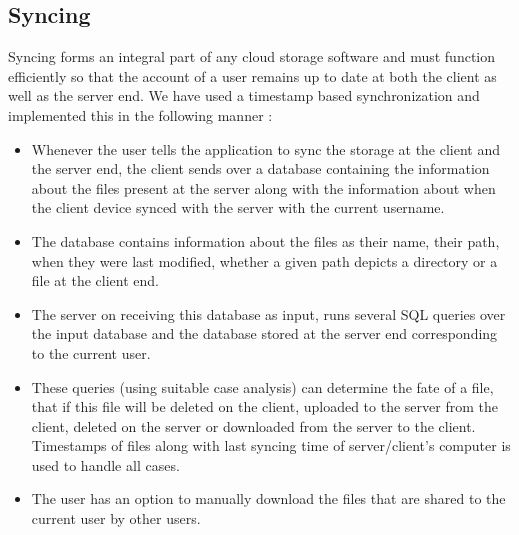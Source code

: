 \documentclass[11pt,fleqn]{book} %
\begin{document}

\subsection{Syncing}

Syncing forms an integral part of any cloud storage software and must function efficiently so that the account of a user remains up to date at both the client as well as the server end. We have used a timestamp based synchronization and implemented this in the following manner :
\begin{itemize}
\item Whenever the user tells the application to sync the storage at the client and the server end, the client sends over a database containing the information about the files present at the server along with the information about when the client device synced with the server with the current username.
\item The database contains information about the files as  their name, their path, when they were last modified, whether a given path depicts a directory or a file at the client end.
\item The server on receiving this database as input, runs several SQL queries over the input database and the database stored at the server end corresponding to the current user.
\item These queries (using suitable case analysis) can determine the fate of a file, that if this file will be deleted on the client, uploaded to the server from the client, deleted on the server or downloaded from the server to the client. Timestamps of files along with last syncing time of server/client's computer is used to handle all cases.
\item The user has an option to manually download the files that are shared to the current user by other users.
\end{itemize}





\end{document}
